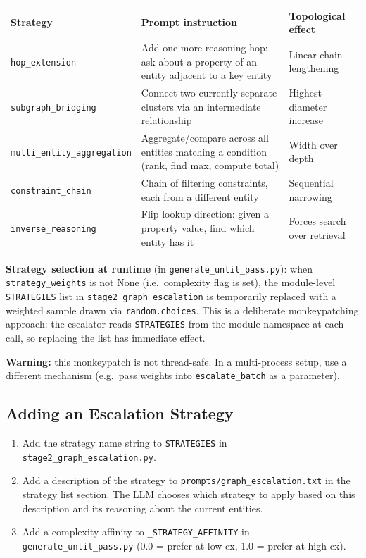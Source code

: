 \documentclass[11pt,a4paper]{article}
\begin{document}
\begin{tabular}{lp{6cm}p{4cm}}
\toprule
\textbf{Strategy} & \textbf{Prompt instruction} & \textbf{Topological effect} \\
\midrule
\texttt{hop\_extension} & Add one more reasoning hop: ask about a property of an entity adjacent to a key entity & Linear chain lengthening \\
\texttt{subgraph\_bridging} & Connect two currently separate clusters via an intermediate relationship & Highest diameter increase \\
\texttt{multi\_entity\_aggregation} & Aggregate/compare across all entities matching a condition (rank, find max, compute total) & Width over depth \\
\texttt{constraint\_chain} & Chain of filtering constraints, each from a different entity & Sequential narrowing \\
\texttt{inverse\_reasoning} & Flip lookup direction: given a property value, find which entity has it & Forces search over retrieval \\
\bottomrule
\end{tabular}

\vspace{0.5em}

\textbf{Strategy selection at runtime} (in \texttt{generate\_until\_pass.py}): when \texttt{strategy\_weights} is not None (i.e.\ complexity flag is set), the module-level \texttt{STRATEGIES} list in \texttt{stage2\_graph\_escalation} is temporarily replaced with a weighted sample drawn via \texttt{random.choices}. This is a deliberate monkeypatching approach: the escalator reads \texttt{STRATEGIES} from the module namespace at each call, so replacing the list has immediate effect.

\textbf{Warning:} this monkeypatch is not thread-safe. In a multi-process setup, use a different mechanism (e.g.\ pass weights into \texttt{escalate\_batch} as a parameter).

\subsection{Adding an Escalation Strategy}

\begin{enumerate}[leftmargin=*,noitemsep]
  \item Add the strategy name string to \texttt{STRATEGIES} in \texttt{stage2\_graph\_escalation.py}.
  \item Add a description of the strategy to \texttt{prompts/graph\_escalation.txt} in the strategy list section. The LLM chooses which strategy to apply based on this description and its reasoning about the current entities.
  \item Add a complexity affinity to \texttt{\_STRATEGY\_AFFINITY} in \texttt{generate\_until\_pass.py} (0.0 = prefer at low cx, 1.0 = prefer at high cx).
\end{enumerate}
\end{document}

